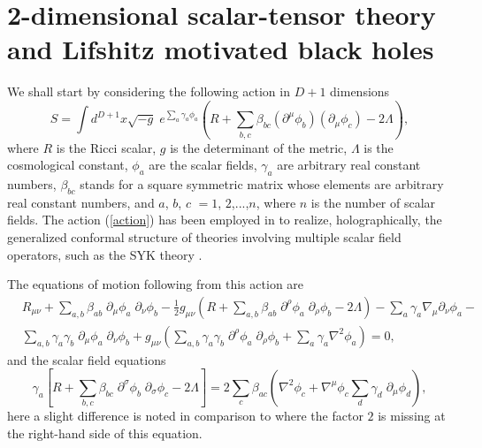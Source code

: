 \documentclass[sn-mathphys,Numbered]{sn-jnl}%
\theoremstyle{thmstyleone}%
\theoremstyle{thmstyletwo}%
\theoremstyle{thmstylethree}%
\begin{document}
\section{2-dimensional scalar-tensor theory and Lifshitz motivated black holes} \label{sec2}
We shall start by considering the following action in $D+1$ dimensions 
%
\begin{equation} \label{action}
    S = \int d^{D+1} x \sqrt{-g} \; e^{\sum_{a} \gamma_a \phi_a} \left ( R + \sum_{b,c} \beta_{bc} (\partial^{\mu} \phi_b)(\partial_{\mu} \phi_c) - 2 \Lambda \right ),
\end{equation}
%
where $R$ is the Ricci scalar, $g$ is the determinant of the metric, $\Lambda$ is the cosmological constant, $\phi_a$ are the scalar fields, $\gamma_a$ are arbitrary real constant numbers, $\beta_{bc}$ stands for a square symmetric matrix whose elements are arbitrary real constant numbers, and $a$, $b$, $c$ $= 1$, $2$,...,$n$, where $n$ is the number of scalar fields. The action (\ref{action}) has been employed in  \cite{Marika syk} to realize, holographically,
the generalized conformal structure \cite{Jevicki,Jevicki2,Jevicki3} of theories involving multiple scalar field operators, such as the SYK theory \cite{Sachdev,Kitaev}.

The equations of motion following from this action are 
%
\begin{equation}\label{ec einstein}
    \begin{split}
        &R_{\mu \nu} + \sum_{a,b} \beta_{ab} \;\partial_{\mu} \phi_a \;\partial_{\nu} \phi_b - \frac{1}{2} g_{\mu \nu} \left (R + \sum_{a,b} \beta_{ab} \; \partial^{\rho} \phi_a \; \partial_{\rho} \phi_b - 2\Lambda \right )- \sum_a \gamma_a \nabla_{\mu} \partial_{\nu} \phi_a -\\ 
        &\sum_{a,b} \gamma_a \gamma_b \;\partial_{\mu} \phi_a \;\partial_{\nu} \phi_b +g_{\mu \nu} \left ( \sum_{a,b} \gamma_a \gamma_b \;\partial^{\rho}\phi_a \;\partial_{\rho} \phi_b + \sum_a \gamma_a \nabla^2 \phi_a \right )= 0,
    \end{split}
\end{equation}
%
and the scalar field equations
%
\begin{equation}
            \gamma_a \left[ R+\sum_{b,c} \beta_{bc} \;\partial^\sigma \phi_b \;\partial_\sigma \phi_c- 2\Lambda \right]
        =2 \sum_{c} \beta_{ac} \left( \nabla^{2} \phi_c + \nabla^{\mu} \phi_c \sum_{d}\gamma_d \;\partial_\mu \phi_d \right),
\end{equation}        
here a slight difference is noted in comparison to \cite{Marika syk} where the factor $2$ is missing at the right-hand side of this equation.
\end{document}
